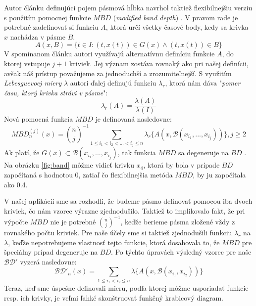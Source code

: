 Autor článku definujúci pojem pásmová hĺbka navrhol taktiež flexibilnejšiu verziu s použitím pomocnej funkcie $ MBD $ (\textit{modified band depth}) \cite{BandDepth}. V pravom rade je potrebné zadefinovať si funkciu $ A $, ktorá určí všetky časové body, kedy sa krivka $ x $ nachádza v pásme $ B $.
\[
	A(x, B) = \{ t \in I : (t, x(t)) \in G(x) \wedge (t, x(t)) \in B \}
\]
V spomínanom článku autori využívajú alternatívnu definíciu funkcie $ A $, do ktorej vstupuje $ j + 1 $ kriviek. Jej význam zostáva rovnaký ako pri našej definícii, avšak náš prístup považujeme za jednoduchší a zrozumiteľnejší. S využitím \textit{Lebesguevoej miery} $ \lambda $ autori ďalej definujú funkciu $ \lambda_{r} $, ktorá nám dáva "\textit{pomer času, ktorý krivka strávi v pásme}":
\[
	\lambda_{r}(A) = \dfrac{\lambda(A)}{\lambda(I)} 
\]
Nová pomocná funkcia $ MBD $ je definovaná nasledovne:
\[
	MBD^{(j)}_{n}(x) = {n \choose j}^{-1} \sum_{1 \leq i_{1} < i_{2} < ... < i_{j} \leq n} \lambda_{r}\{ A(x, \mathcal{B}(x_{i_{1}}, ... ,x_{i_{j}})) \}, j \geq 2
\]
Ak platí, že $ G(x) \subset \mathcal{B}(x_{i_{1}}, ... ,x_{i_{j}}) $, tak funkcia $ MBD $ sa degeneruje na $ BD $ \cite{FunctionalBoxplot}. Na obrázku \ref{fig:band} môžme vidieť krivku $ x_{4} $, ktorá by bola v prípade $ BD $ započítaná s hodnotou 0, zatiaľ čo flexibilnejšia metóda $ MBD $, by ju započítala ako 0.4.

V našej aplikácii sme sa rozhodli, že budeme pásmo definovať pomocou iba dvoch kriviek, čo nám vzorec výrazne zjednodušilo. Taktiež to implikovalo fakt, že pri výpočte $ MBD $ nie je potrebné $ {n \choose j}^{-1} $, keďže berieme pásma zložené vždy z rovnakého počtu kriviek. Pre naše účely sme si taktiež zjednodušili funkciu $ \lambda_{r} $ na $ \lambda $, keďže nepotrebujeme vlastnosť tejto funkcie, ktorá dosahovala to, že $ MBD $ pre špeciálny prípad degeneruje na $ BD $. Po týchto úpravách výsledný vzorec pre naše $ \mathcal{BD}' $ vyzerá nasledovne:
\[
	\mathcal{BD}'_{n}(x) = \sum_{1 \leq i_{1} < i_{2} \leq n} \lambda\{ A(x, \mathcal{B}(x_{i_{1}},x_{i_{2}})) \}
\]
Teraz, keď sme úspešne definovali mieru, podľa ktorej môžme usporiadať funkcie resp. ich krivky, je veľmi ľahké skonštruovať funkčný krabicový diagram.

